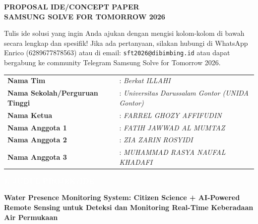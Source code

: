 \documentclass[12pt,a4paper]{article}
\title{}
\author{}
\date{}
\newcommand{\sectionbox}[1]{%
  \colorbox{samsungblue}{%
    \parbox{\textwidth}{%
      \textcolor{white}{\large\bfseries #1}%
    }%
  }%
}
\begin{document}
\thispagestyle{empty}
\vspace*{1cm}

\begin{center}
  \huge\textbf{PROPOSAL IDE/CONCEPT PAPER}\\[0.5cm]
  \huge\textbf{SAMSUNG SOLVE FOR TOMORROW 2026}\\[2cm]
\end{center}

\normalsize

Tulis ide solusi yang ingin Anda ajukan dengan mengisi kolom-kolom di bawah secara lengkap dan spesifik! Jika ada pertanyaan, silakan hubungi di WhatsApp Enrico (6289677878563) atau di email: \texttt{sft2026@dibimbing.id} atau dapat bergabung ke community Telegram Samsung Solve for Tomorrow 2026.

\vspace{1.5cm}

\begin{tabularx}{\textwidth}{|l|X|}
  \hline
  \textbf{Nama Tim} & : \textit{Berkat ILLAHI} \\[0.3cm]
  \textbf{Nama Sekolah/Perguruan Tinggi} & : \textit{Universitas Darussalam Gontor (UNIDA Gontor)} \\[0.3cm]
  \textbf{Nama Ketua} & : \textit{FARREL GHOZY AFFIFUDIN} \\[0.3cm]
  \textbf{Nama Anggota 1} & : \textit{FATIH JAWWAD AL MUMTAZ} \\[0.3cm]
  \textbf{Nama Anggota 2} & : \textit{ZIA ZARIN ROSYIDI} \\[0.3cm]
  \textbf{Nama Anggota 3} & : \textit{MUHAMMAD RASYA NAUFAL KHADAFI} \\[0.3cm]
  \hline
\end{tabularx}

\newpage

\sectionbox{1. JUDUL PROJEK/IDE}

\vspace{0.5cm}

\textbf{\Large Water Presence Monitoring System: Citizen Science + AI-Powered Remote Sensing untuk Deteksi dan Monitoring Real-Time Keberadaan Air Permukaan}
\end{document}
